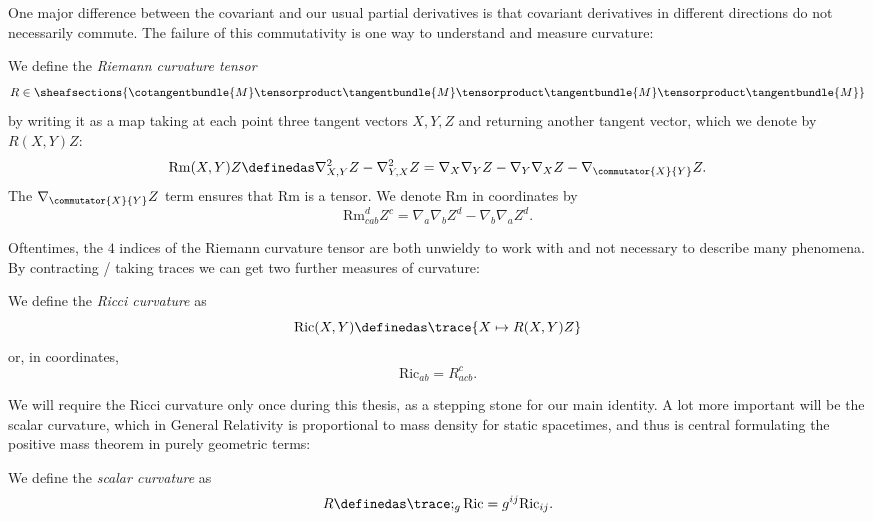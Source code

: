 \documentclass[titlepage,numbers=noenddot,headinclude,oneside,%
footinclude=true,cleardoublepage=empty,%
BCOR=5mm,paper=a4,fontsize=11pt,%
english,%
]{scrartcl}
\newcommand{\Ricci}{\mathrm{Ric}} %
\newcommand{\riemanncurvature}{\mathrm{Rm}} %
\begin{document}
One major difference between the covariant and our usual partial derivatives is that covariant derivatives in different directions do not necessarily commute. The failure of this commutativity is one way to understand and measure curvature:
\begin{definition}
    We define the \emph{Riemann curvature tensor} 
    \begin{equation*}
        R\in \sheafsections{\cotangentbundle{M}\tensorproduct \tangentbundle{M}\tensorproduct \tangentbundle{M}\tensorproduct \tangentbundle{M}}
    \end{equation*} 
    by writing it as a map taking at each point three tangent vectors \( X,Y,Z \) and returning another tangent vector, which we denote by \( R(X,Y)Z \):
    \begin{equation*}
        \riemanncurvature(X,Y)Z\definedas \nabla^2_{X,Y}Z-\nabla^2_{Y,X}Z=\nabla_X \nabla_Y Z- \nabla_Y \nabla_X Z -\nabla_{\commutator{X}{Y}}Z.
    \end{equation*}
    The \( \nabla_{\commutator{X}{Y}}Z \) term ensures that \(  \riemanncurvature \) is a tensor. We denote \(  \riemanncurvature \) in coordinates by
    \begin{equation*}
        \riemanncurvature^d_{cab}Z^c=\nabla_a \nabla_b Z^d-\nabla_b \nabla_a Z^d.
    \end{equation*}
\end{definition}
Oftentimes, the \( 4 \) indices of the Riemann curvature tensor are both unwieldy to work with and not necessary to describe many phenomena. By contracting / taking traces we can get two further measures of curvature:
\begin{definition}
    We define the \emph{Ricci curvature} as
    \begin{equation*}
        \Ricci(X,Y)\definedas\trace{X\mapsto R(X,Y)Z}
    \end{equation*}
    or, in coordinates,
    \begin{equation*}
        \Ricci_{ab}=R^c_{acb}.
    \end{equation*}
\end{definition}
We will require the Ricci curvature only once during this thesis, as a stepping stone for our main identity. A lot more important will be the scalar curvature, which in General Relativity is proportional to mass density for static spacetimes, and thus is central formulating the positive mass theorem in purely geometric terms:
\begin{definition}
    We define the \emph{scalar curvature} as
    \begin{equation*}
        R\definedas \trace;_g \Ricci=g^{ij}\Ricci_{ij}.
    \end{equation*}
\end{definition}
\printbibliography
\end{document}
